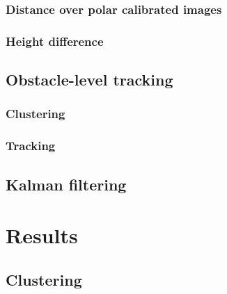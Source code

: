 \subsubsection{Distance over polar calibrated images}\label{ch:chapter04_01_03_04}
\subsubsection{Height difference}\label{ch:chapter04_01_03_05}



\subsection{Obstacle-level tracking}\label{ch:chapter04_01_04}
\subsubsection{Clustering}\label{ch:chapter04_01_04_01}
\subsubsection{Tracking}\label{ch:chapter04_01_04_02}
\subsection{Kalman filtering}\label{ch:chapter04_01_05}

\section{Results}\label{ch:chapter04_06}

\subsection{Clustering}\label{ch:chapter04_06_01}


